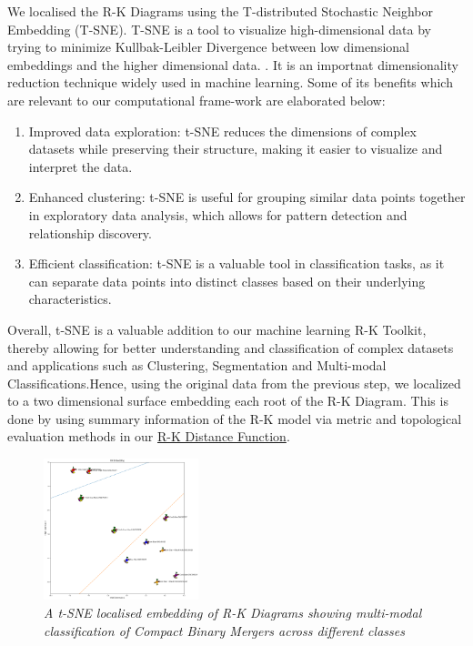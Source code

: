 We localised the R-K Diagrams using the T-distributed Stochastic Neighbor Embedding (T-SNE). T-SNE is a tool to visualize high-dimensional data by trying to minimize Kullbak-Leibler Divergence between low dimensional embeddings and the higher dimensional data. \cite{sklearn.manifold.tsne_2014}. It is an importnat dimensionality reduction technique widely used in machine learning.\cite{25.0_tSNE1} Some of its benefits which are relevant to our computational frame-work are elaborated below:

\begin{enumerate}
    
 \item Improved data exploration: t-SNE reduces the dimensions of complex datasets while preserving their structure, making it easier to visualize and interpret the data.
 \item Enhanced clustering: t-SNE is useful for grouping similar data points together in exploratory data analysis, which allows for pattern detection and relationship discovery.
 \item Efficient classification: t-SNE is a valuable tool in classification tasks, as it can separate data points into distinct classes based on their underlying characteristics. \cite{25.1_tSNE2} \cite{25.2_linderman2019tSNE}

\end{enumerate}

Overall, t-SNE is a valuable addition to our machine learning R-K Toolkit, thereby allowing for better understanding and classification of complex datasets and applications such as Clustering, Segmentation and Multi-modal Classifications.\cite{25.3_tSNE2018analysis}Hence, using the original data from the previous step, we localized to a two dimensional surface embedding each root of the R-K Diagram. This is done by using summary information of the R-K model via metric and topological evaluation methods in our \hyperref[sec:rk_distance]{R-K Distance Function}.

\begin{figure}[H]
 	\centering
        \includegraphics[width=0.4\textwidth]{images/ligo_multimodal_class_tsne.png}
	\caption{\textit{A t-SNE localised embedding of R-K Diagrams showing multi-modal classification of Compact Binary Mergers across different classes}}
	\label{fig:ligo_tsne}
\end{figure}

